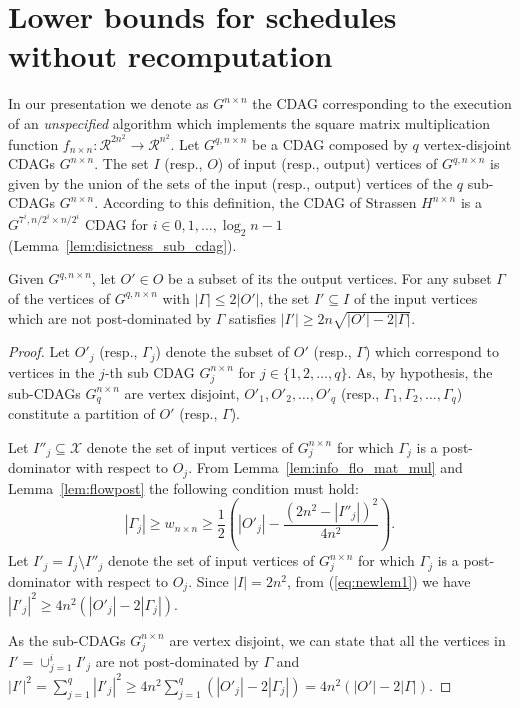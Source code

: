 \documentclass[a4paper,UKenglish]{lipics-v2016}
\newcommand{\ri}{\mathcal{R}}
\begin{document}
\section{Lower bounds for schedules without recomputation}\label{sect:stranore}
In our presentation we denote as $G^{n \times n}$ the CDAG corresponding to the execution of an \emph{unspecified} algorithm which implements the square matrix multiplication function $f_{n\times n}:\ri^{2n^2}\rightarrow\ri^{n^2}$. 
Let $G^{q,n\times n}$ be a CDAG composed by $q$ vertex-disjoint CDAGs
$G^{n\times n}$. The set $I$ (resp., $O$) of input (resp., output)
vertices of $G^{q,n\times n}$ is given by the union of the sets of the
input (resp., output) vertices of the $q$ sub-CDAGs $G^{n\times
  n}$. According to this definition, the CDAG of Strassen $H^{n\times
  n}$ is a $G^{7^i,n/2^i\times n/2^i}$ CDAG for
$i\in{0,1,\ldots,\log_2 n -1 }$ (Lemma~\ref{lem:disictness_sub_cdag}). 

\begin{lemma}\label{lem:newbasenr}
Given $G^{q,n\times n}$, let $O'\in O$ be a subset of its the output
vertices. For any subset $\Gamma$ of the vertices of $G^{q,n\times n}$
with $|\Gamma|\leq 2|O'|$, the set $I'\subseteq I$ of the input
vertices which are not post-dominated by $\Gamma$ satisfies $|I'|\geq
2n\sqrt{|O'|-2|\Gamma|}$.
\end{lemma}
\begin{proof}
	Let $O'_j$ (resp., $\Gamma_j$) denote the subset of $O'$ (resp., $\Gamma$) which correspond to vertices in the $j$-th sub CDAG $G^{n\times n}_j$ for $j\in\{1,2,\ldots,q\}$. As, by hypothesis, the sub-CDAGs $G^{n\times n}_q$ are vertex disjoint, $O'_1,O'_2,\ldots,O'_q$ (resp., $\Gamma_1,\Gamma_2,\ldots,\Gamma_q$) constitute a partition of $O'$ (resp., $\Gamma$). 
	
	Let $I''_j\subseteq \mathcal{X}$ denote the set of input vertices of $G^{n\times n}_j$ for which $\Gamma_j$ is a post-dominator with respect to $O_j$. 
From Lemma~\ref{lem:info_flo_mat_mul} and Lemma~\ref{lem:flowpost} the following condition must hold:
	\begin{equation}\label{eq:newlem1}
		|\Gamma_j|\geq w_{n\times n} \geq 
		\frac{1}{2}\left(|O'_j|-\frac{\left(2n^2 - |I''_j|\right)^2}{4n^2}\right).
	\end{equation}	
	Let $I'_j =I_j \setminus I''_j$ denote the set of input vertices of $G^{n\times n}_j$ for which $\Gamma_j$ is a post-dominator with respect to $O_j$. Since $|I|= 2n^2$, from (\ref{eq:newlem1}) we have $|I'_j|^2  \geq 4n^2\left(|O'_j|-2|\Gamma_j|\right)$.
	
	As the sub-CDAGs $G^{n\times n}_j$ are vertex disjoint, we can state that all the vertices in $I'=\cup_{j=1}^i I'_j$ are not post-dominated by $\Gamma$ and
	$
		|I'|^2 = \sum_{j=1}^q|I'_j|^2 \geq   4n^2\sum_{j=1}^q\left(|O'_j|-2|\Gamma_j|\right) = 4n^2\left(|O'|-2|\Gamma|\right)
	$.
\end{proof}
\end{document}
